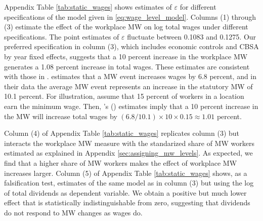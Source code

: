 Appendix Table \ref{tab:static_wages} shows estimates of $\varepsilon$ for 
different specifications of the model given in \eqref{eq:wage_level_model}.
Columns (1) through (3) estimate the effect of the workplace MW on log total
wages under different specifications.
The point estimates of $\varepsilon$ fluctuate between 0.1083 and 0.1275.
Our preferred specification in column (3), which includes
economic controls and CBSA by year fixed effects, suggests that a 10 percent 
increase in the workplace MW generates a 1.08 percent increase in total wages.
These estimates are consistent with those in \textcite{CegnizEtAl2019}.
\textcite[][Table I]{CegnizEtAl2019} estimates that a MW event increases wages
by 6.8 percent, and in their data the average MW event represents an increase in 
the statutory MW of 10.1 percent.
For illustration, assume that 15 percent of workers in a location earn the
minimum wage.
Then, \citeauthor{CegnizEtAl2019}'s (\citeyear{CegnizEtAl2019}) estimates imply 
that a 10 percent increase in the MW will increase total wages by 
$(6.8/10.1)\times 10\times 0.15 \approx 1.01$ percent.

Column (4) of Appendix Table \ref{tab:static_wages} replicates column (3)
but interacts the workplace MW measure with the standarized share of MW workers
estimated as explained in Appendix \ref{sec:assigning_mw_levels}.
As expected, we find that a higher share of MW workers makes the effect of
workplace MW increases larger.
Column (5) of Appendix Table \ref{tab:static_wages} shows, as a falsification
test, estimates of the same model as in column (3) but using the log of total
dividends as dependent variable.
We obtain a positive but much lower effect that is statistically 
indistinguishable from zero, suggesting that dividends do not respond to 
MW changes as wages do.
